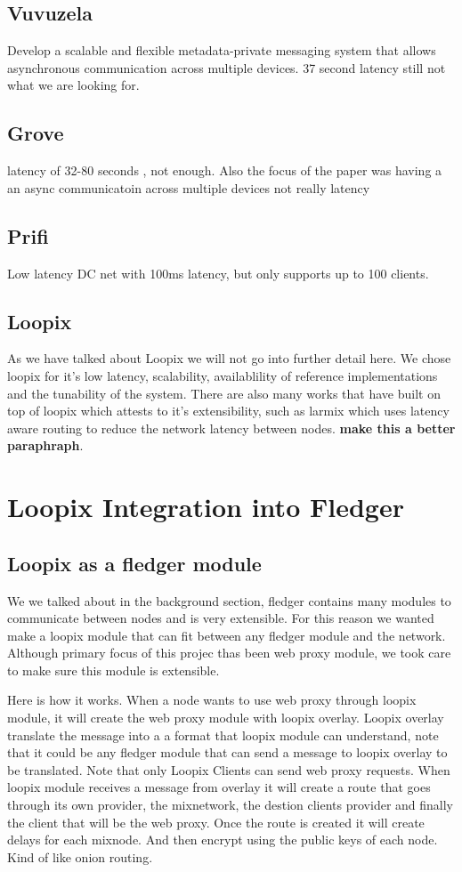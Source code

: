 \documentclass[a4paper,11pt,oneside]{report}
\begin{document}
\subsection{Vuvuzela}
Develop a scalable and flexible metadata-private messaging system that allows asynchronous communication across multiple devices. 37 second latency still not what we are looking for. 
\subsection{Grove}
latency of 32-80 seconds , not enough. Also the focus of the paper was having a an async communicatoin across multiple devices not really latency
\subsection{Prifi}
Low latency DC net with 100ms latency, but only supports up to 100 clients. 

\subsection{Loopix}
As we have talked about Loopix we will not go into further detail here. We chose loopix for it's low latency, scalability, availablility of reference implementations and the tunability of the system. There are also many works that have built on top of loopix which attests to it's extensibility, such as larmix which uses latency aware routing to reduce the network latency between nodes. \textbf{make this a better paraphraph}.

\section{Loopix Integration into Fledger}
\subsection{Loopix as a fledger module}
We we talked about in the background section, fledger contains many modules to communicate between nodes and is very extensible. For this reason we wanted make a loopix module that can fit between any fledger module and the network. Although primary focus of this projec thas been web proxy module, we took care to make sure this module is extensible.

Here is how it works. When a node wants to use web proxy through loopix module, it will create the web proxy module with loopix overlay. Loopix overlay translate the message into a a format that loopix module can understand, note that it could be any fledger module that can send a message to loopix overlay to be translated. Note that only Loopix Clients can send web proxy requests. When loopix module receives a message from overlay it will create a route that goes through its own provider, the mixnetwork, the destion clients provider and finally the client that will be the web proxy. Once the route is created it will create delays for each mixnode. And then encrypt using the public keys of each node. Kind of like onion routing.
\end{document}
